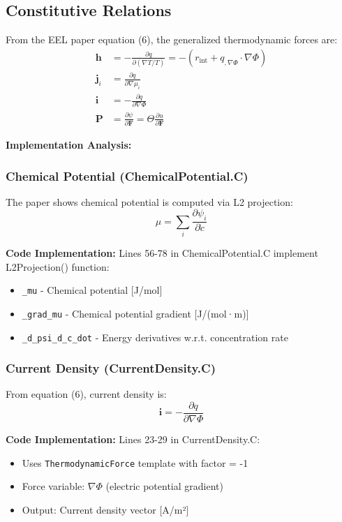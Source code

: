 \documentclass[11pt,a4paper]{article}
\begin{document}
\subsection{Constitutive Relations}

From the EEL paper equation (6), the generalized thermodynamic forces are:
\begin{align}
\mathbf{h} &= -\frac{\partial q}{\partial (\nabla T/T)} = -(r_{\text{int}} + q_{,\nabla\Phi} \cdot \nabla\Phi) \\
\mathbf{j}_i &= \frac{\partial q}{\partial \nabla\mu_i} \\
\mathbf{i} &= -\frac{\partial q}{\partial \nabla\Phi} \\
\mathbf{P} &= \frac{\partial \psi}{\partial \mathbf{F}} = \Theta \frac{\partial u}{\partial \mathbf{F}}
\end{align}

\textbf{Implementation Analysis:}

\subsubsection{Chemical Potential (ChemicalPotential.C)}
The paper shows chemical potential is computed via L2 projection:
\begin{equation}
\mu = \sum_i \frac{\partial \psi_i}{\partial \dot{c}}
\end{equation}

\textbf{Code Implementation:} Lines 56-78 in ChemicalPotential.C implement L2Projection() function:
\begin{itemize}
\item \texttt{\_mu} - Chemical potential [J/mol]
\item \texttt{\_grad\_mu} - Chemical potential gradient [J/(mol·m)]
\item \texttt{\_d\_psi\_d\_c\_dot} - Energy derivatives w.r.t. concentration rate
\end{itemize}

\subsubsection{Current Density (CurrentDensity.C)}
From equation (6), current density is:
\begin{equation}
\mathbf{i} = -\frac{\partial q}{\partial \nabla\Phi}
\end{equation}

\textbf{Code Implementation:} Lines 23-29 in CurrentDensity.C:
\begin{itemize}
\item Uses \texttt{ThermodynamicForce} template with factor = -1
\item Force variable: $\nabla\Phi$ (electric potential gradient)
\item Output: Current density vector [A/m²]
\end{itemize}
\end{document}

